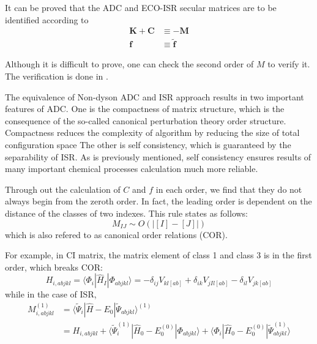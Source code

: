 It can be proved that the ADC and ECO-ISR secular matrices are to be identified according to
\begin{equation}
	\begin{aligned} \boldsymbol{K}+\boldsymbol{C} & \equiv-\boldsymbol{M} \\ \boldsymbol{f} & \equiv \tilde{\boldsymbol{f}} \end{aligned}
\end{equation}

Although it is difficult to prove, one can check the second order of $M$ to verify it.
The verification is done in \cite{main}.

The equivalence of Non-dyson ADC and ISR approach results in two important features of ADC.
One is the compactness of matrix structure, which is the consequence of the so-called canonical perturbation theory order structure.
Compactness reduces the complexity of algorithm by reducing the size of total configuration space
The other is self consistency, which is guaranteed by the separability of ISR.
As is previously mentioned, self consistency ensures results of many important chemical processes calculation much more reliable.

Through out the calculation of $C$ and $f$ in each order, we find that they do not always begin from the zeroth order.
In fact, the leading order is dependent on the distance of the classes of two  indexes.
This rule states as follows:
\begin{equation}
	M_{I J} \sim O( | [I]-[J] | )
\end{equation}
which is also refered to as canonical order relations (COR).

For example, in CI matrix, the matrix element of class 1 and class 3 is in the first order, which breaks COR:
\begin{equation}
	H_{i, a b j k l}=\langle\Phi_{i}|\hat{H}_{I}| \Phi_{a b j k l}\rangle=-\delta_{i j} V_{k l[a b]}+\delta_{i k} V_{j I l[a b]}-\delta_{i l} V_{j k[a b]}
\end{equation}
while in the case of ISR,
\begin{equation}
	\begin{aligned} M_{i, a b j k l}^{(1)} &=\langle\tilde{\Psi}_{i}|\hat{H}-E_{0}| \tilde{\Psi}_{a b j k l}\rangle^{(1)} \\ &=H_{i, a b j k l}+\langle\tilde{\Psi}_{i}^{(1)}|\hat{H}_{0}-E_{0}^{(0)}| \Phi_{a b j k l}\rangle+\langle\Phi_{i}|\hat{H}_{0}-E_{0}^{(0)}| \tilde{\Psi}_{a b j k l}^{(1)}\rangle \end{aligned}
\end{equation}


